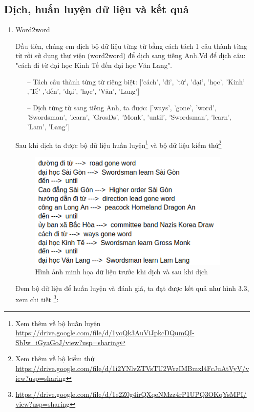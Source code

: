 \subsection{Dịch, huấn luyện dữ liệu và kết quả}
\begin{enumerate}
    \item Word2word
          
          Đầu tiên, chúng em dịch bộ dữ liệu từng từ bằng cách tách 1 câu thành từng từ rồi sử dụng thư viện (word2word) để dịch sang tiếng Anh.Vd để dịch câu: "cách đi từ đại học Kinh Tế đến đại học Văn Lang".
          \begin{itemize}
              \item[--] Tách câu thành từng từ riêng biệt: ['cách', 'đi', 'từ', 'đại', 'học', 'Kinh' ,'Tế' ,'đến', 'đại', 'học', 'Văn', 'Lang']
              \item[--] Dịch từng từ sang tiếng Anh, ta được: ['ways', 'gone', 'word', 'Swordsman', 'learn', 'GrosDs', 'Monk', 'until', 'Swordsman', 'learn', 'Lam', 'Lang']
          \end{itemize}
          
          Sau khi dịch ta được bộ dữ liệu huấn luyện\footnote{Xem thêm về bộ huấn luyện \url{https://drive.google.com/file/d/1yoQk3AuViJpkcDQumQI-SbIw_iGyaGoJ/view?usp=sharing}} và bộ dữ liệu kiểm thử\footnote{Xem thêm về bộ kiểm thử \url{https://drive.google.com/file/d/1i2YNlvZTVsTU2WrzIMBmxl4FcJuAtVyV/view?usp=sharing}}
          \begin{figure}[htp]
              \centering
              \includegraphics[width=10cm]{images/trainingdata_dichtungtu.png}
              \caption{Hình ảnh minh họa dữ liệu trước khi dịch và sau khi dịch}
              \label{fig:sodohethongchiduong}
          \end{figure}
          
          Đem bộ dữ liệu để huấn luyện và đánh giá, ta đạt được kết quả như hình 3.3, xem chi tiết \footnote{\url{https://drive.google.com/file/d/1e2Z0g4irQXqeNMzz4rP1UPQ3OKqYsMPI/view?usp=sharing}}:
          

\end{enumerate}
